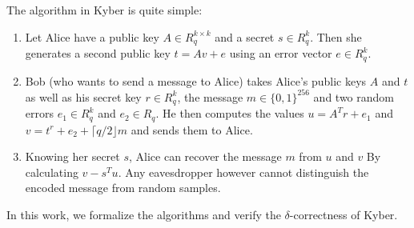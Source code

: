\documentclass[11pt,a4paper]{article}
\begin{document}
The algorithm in Kyber is quite simple:
\begin{enumerate}
\item Let Alice have a public key $A \in R_q^{k\times k}$ and a secret $s\in R_q^k$. Then she generates a second public key $t = Av + e$ using an error vector $e\in R_q^k$.
\item Bob (who wants to send a message to Alice) takes Alice's public keys $A$ and $t$ as well as his secret key $r\in R_q^k$, the message $m\in\{0,1\}^{256}$ and two random errors $e_1\in R_q^k$ and $e_2\in R_q$. He then computes the values 
$u = A^Tr + e_1$ and $v = t^r + e_2 + \lceil q/2\rfloor m$ and sends them to Alice.
\item Knowing her secret $s$, Alice can recover the message $m$ from $u$ and $v$ By calculating $v-s^Tu$. Any eavesdropper however cannot distinguish the encoded message from random samples.
\end{enumerate}
In this work, we formalize the algorithms and verify the $\delta$-correctness of Kyber.

\vspace{1cm}





\end{document}
